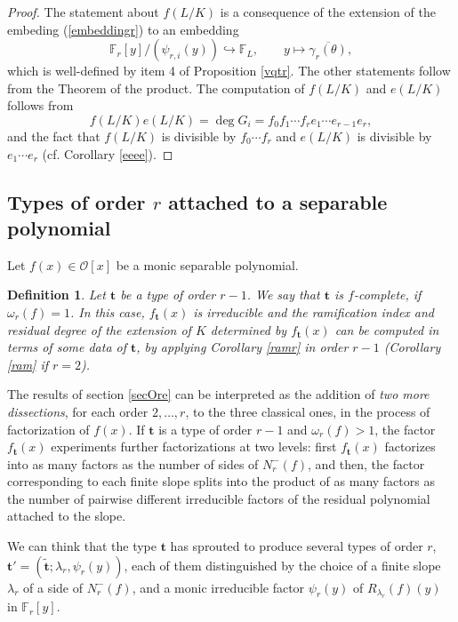 \documentclass{amsart}
\newtheorem{definition}[theorem]{Definition}
\def\op{\operatorname}
\def\dg{\op{deg}}
\def\ff#1{\mathbb{F}_{#1}}
\def\gb#1{\overline{\gamma_{#1}(\t)}}
\def\la{\lambda}
\def\om{\omega}
\def\oo{{\mathcal O}}
\def\t{\theta}
\def\ty{\mathbf{t}}
\def\zpx{\oo[x]}
\begin{document}
\begin{proof}
The statement about $f(L/K)$ is a consequence of the extension of the embeding (\ref{embeddingr}) to an embedding
\begin{equation}\label{embeddingr+1}
\ff{r}[y]/(\psi_{r,i}(y))\hookrightarrow\ff{L}, \qquad y\mapsto \gb{r},
\end{equation}
which is well-defined by item 4 of Proposition \ref{vqtr}. The other statements follow from the Theorem of the product. The computation of $f(L/K)$ and $e(L/K)$ follows from 
$$f(L/K)e(L/K)=\dg G_i=f_0f_1\cdots f_re_1\cdots e_{r-1}e_r,
$$ and the fact that $f(L/K)$ is divisible by $f_0\cdots f_r$ and $e(L/K)$ is divisible by $e_1\cdots e_r$ (cf. Corollary
\ref{eeee}). 
\end{proof}

\subsection{Types of order $r$ attached to a separable polynomial}
Let $f(x)\in\zpx$ be a monic separable polynomial.
\begin{definition}
Let $\ty$ be a type of order $r-1$. We say that $\ty$ is \emph{$f$-complete}, if $\om_r(f)=1$. In this case, $f_\ty(x)$ is irreducible and the ramification index and residual degree of the extension of $K$ determined by $f_\ty(x)$ can be computed in terms of some data of $\ty$, by applying Corollary \ref{ramr} in order $r-1$ (Corollary \ref{ram} if $r=2$).
\end{definition}

The results of section \ref{secOre} can be interpreted as the addition of \emph{two more dissections}, for each order $2,\dots,r$, to the three classical ones, in the process of factorization of $f(x)$. If  $\ty$ is a type of order $r-1$ and  $\om_r(f)>1$, the factor $f_{\ty}(x)$ experiments further factorizations at two levels: first $f_{\ty}(x)$ factorizes into as many factors as the number of sides of $N_r^-(f)$, and then, the factor corresponding to each finite slope splits into the product of as many factors as the number of pairwise different irreducible factors of the residual polynomial attached to the slope.

We can think that the type $\ty$ has sprouted to produce several types of order $r$,
$\ty'=(\tilde{\ty};\la_r,\psi_r(y))$, each of them distinguished by the choice of a finite slope $\la_r$ of a side of $N_r^-(f)$, and a monic irreducible factor $\psi_r(y)$ of $R_{\la_r}(f)(y)$ in $\ff{r}[y]$. 
\end{document}
